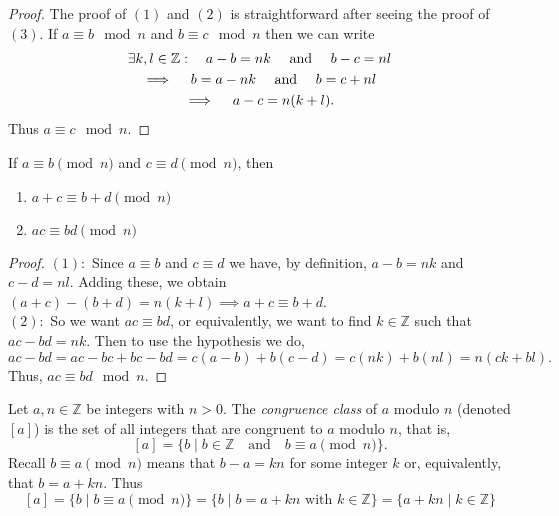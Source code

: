 \documentclass[../main.tex]{subfiles}
\begin{document}
\begin{proof}
The proof of $(1)$ and $(2)$ is straightforward after seeing the proof of $(3)$. If $ a \equiv b \mod{n}$ and $ b \equiv c \mod{n}$ then we can write
\begin{gather*}
    \exists k,l \in \mathbb{Z}: \quad a - b = nk \quad \textnormal{ and } \quad b - c = nl \\
    \implies \quad b = a - nk \quad \textnormal{ and } \quad b = c + nl \\
    \implies \quad a - c = n(k+l).
\end{gather*}
Thus $ a \equiv c \mod{n}$.

\end{proof}







\begin{proposition}\label{prp:mod_arithmetic}
If $ a \equiv b \pmod{n}$ and $ c \equiv d \pmod{n}$, then 
\begin{enumerate}
    \item $ a+c \equiv b+d \pmod{n}$
    \item $ ac \equiv bd \pmod{n}$
\end{enumerate}
\end{proposition}


\begin{proof}
$(1):$ Since $ a \equiv b $ and $ c \equiv d$ we have, by definition, $ a - b = nk$ and $ c - d = nl $. Adding these, we obtain $ (a+c) - (b+d) = n(k+l) \implies a + c \equiv b + d$. \\
$(2):$ So we want $ ac \equiv bd $, or equivalently, we want to find $ k \in \mathbb{Z}$ such that $ ac - bd = nk$. Then to use the hypothesis we do, 
\[
ac - bd = ac - bc + bc - bd = c(a-b) + b(c-d) = c(nk) + b(nl) = n(ck+bl).
\]
Thus, $ ac \equiv bd \mod{n}$.

\end{proof}








\begin{definition}
Let $a, n \in \mathbb{Z}$ be integers with $n > 0$. The \textit{congruence class} of $a$ modulo $n$ (denoted $[a]$) is the set of all integers that are congruent to $a$ modulo $n$, that is,
\[
    [a] = \{b \mid b \in \mathbb{Z} \quad \text{and} \quad b \equiv a \pmod{n} \}.
\]
Recall $b \equiv a \pmod{n}$ means that $b - a = kn$ for some integer $k$ or, equivalently, that $b = a + kn$. Thus
\[
[a] = \{b \mid b \equiv a \pmod{n} \} = \{b \mid b = a + kn \text{ with } k \in \mathbb{Z} \} = \{a + kn \mid k \in \mathbb{Z} \}
\]
\end{definition}
\end{document}
